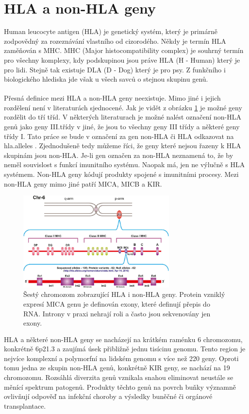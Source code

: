 \documentclass[czech,DP]{thesiskiv}
\numberwithin{equation}{section}
\begin{document}
\section{HLA a non-HLA geny}
Human leucocyte antigen (HLA) je genetický systém, který je primárně zodpovědný za rozeznávání vlastního od cizorodého. Někdy je termín HLA zaměňován s MHC. MHC (Major histocompatibility complex) je souhrný termín pro všechny komplexy, kdy podskupinou jsou práve HLA (H - Human) který je pro lidi. Stejně tak existuje DLA (D - Dog) který je pro psy. Z funkčního i biologického hlediska jde však u všech savců o stejnou skupinu genů. \cite{KIR_transplantace_jindra}
\\
\\
Přesná definice mezi HLA a non-HLA geny neexistuje. Mimo jiné i jejich rozdělení není v literaturách sjednocené. Jak je vidět z obrázku \ref{fig:hla_genome} je možné geny rozdělit do tří tříd. V některých literaturach je možné nalést označení non-HLA genů jako geny III.třídy v jiné, že jsou to všechny geny III třídy a některé geny třídy I. Tato práce se bude v označení za gen non-HLA či HLA odkazovat na hla.alleles \cite{imgt_hla_database}. Zjednodušeně tedy můžeme říci, že geny které nejsou řazeny k HLA skupinám jsou non-HLA. Je-li gen označen za non-HLA neznamená to, že by neměl souvislost s funkcí imunitního systému. Naopak má, jen ne výlučně s HLA systémem. Non-HLA geny kódují produkty spojené s imunitními procesy. Mezi non-HLA geny mimo jiné patří MICA, MICB a KIR. \cite{imgt_hla_database}

\begin{figure}[H]		
		\centering
		\includegraphics[width=300px]{./img/genom6_mica.jpg}
		\caption{Šestý chromozom zobrazující HLA i non-HLA geny. Protein vzniklý expresí MICA genu je definován exony, které definují přepis do RNA. Introny v praxi nehrají roli a často jsou sekvenovány jen exony. \cite{chromozome6_mica} 
		}
		\label{fig:hla_genome}
\end{figure}

\noindent
HLA a některé non-HLA geny se nacházejí na krátkém raménku 6 chromozomu, konkrétně 6p21.3 a zaujímá úsek přibližně jednu tisícinu genomu. Tento region je nejvíce komplexní a polymorfní na lidském genomu s více než 220 geny. Oproti tomu jedna ze skupin non-HLA genů, konkrétně KIR geny, se nachází na 19 chromozomu. Rozsáhlá diverzita genů vznikala snahou eliminovat neustále se měnící spektrum patogenů. Produkty těchto genů na povrch buňky významně ovlivňují odpověď na infekční choroby a výsledky buněčné či orgánové transplantace. \cite{imgt_hla_database}
 
\end{document}
